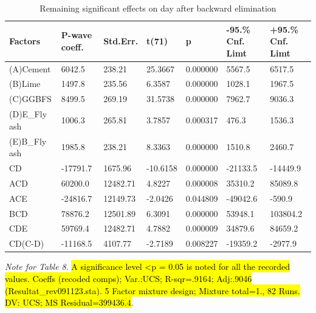 \documentclass[materials,article,submit,pdftex,moreauthors]{Definitions/mdpi}
\begin{document}
\begin{table}[H]
\begin{threeparttable}
\caption{Remaining significant effects on day  after\hl{ }backward elimination}
\footnotesize
    \centering
    \begin{tabular}{|l|l|l|l|l|l|l|}
    \hline
        Factors & P-wave coeff. & Std.Err. & t(71) & p & -95.\% Cnf. Limt & +95.\% Cnf. Limt \\ \hline
        (A)Cement & 6042.5 & 238.21 & 25.3667 & 0.000000 & 5567.5 & 6517.5 \\ \hline
        (B)Lime & 1497.8 & 235.56 & 6.3587 & 0.000000 & 1028.1 & 1967.5 \\ \hline
        (C)GGBFS & 8499.5 & 269.19 & 31.5738 & 0.000000 & 7962.7 & 9036.3 \\ \hline
        (D)E\_Fly ash & 1006.3 & 265.81 & 3.7857 & 0.000317 & 476.3 & 1536.3 \\ \hline
        (E)B\_Fly ash & 1985.8 & 238.21 & 8.3363 & 0.000000 & 1510.8 & 2460.7 \\ \hline
        CD & -17791.7 & 1675.96 & -10.6158 & 0.000000 & -21133.5 & -14449.9 \\ \hline
        ACD & 60200.0 & 12482.71 & 4.8227 & 0.000008 & 35310.2 & 85089.8 \\ \hline
        ACE & -24816.7 & 12149.73 & -2.0426 & 0.044809 & -49042.6 & -590.9 \\ \hline
        BCD & 78876.2 & 12501.89 & 6.3091 & 0.000000 & 53948.1 & 103804.2 \\ \hline
        CDE & 59769.4 & 12482.71 & 4.7882 & 0.000009 & 34879.6 & 84659.2 \\ \hline
        CD(C-D) & -11168.5 & 4107.77 & -2.7189 & 0.008227 & -19359.2 & -2977.9 \\ \hline
    \end{tabular}
    \label{tab:8}
      \begin{tablenotes}
      \scriptsize
      	\item \emph{Note for Table 8}. \hl{A significance level <p = 0.05 is noted for all the recorded values. Coeffs (recoded comps); Var.:UCS; R-sqr=.9164; Adj:.9046 (Resultat\_rev091123.sta). 5 Factor mixture design; Mixture total=1., 82 Runs. DV: UCS; MS Residual=399436.4}.
    \end{tablenotes}
  \end{threeparttable}
\end{table}
\end{document}
